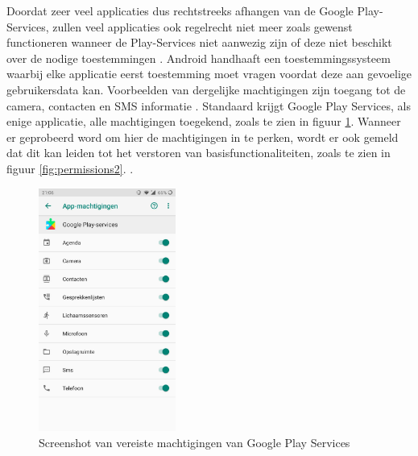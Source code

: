 Doordat zeer veel applicaties dus rechtstreeks afhangen van de Google Play-Services, zullen veel applicaties ook regelrecht niet meer zoals gewenst functioneren wanneer de Play-Services niet aanwezig zijn of deze niet beschikt over de nodige toestemmingen \autocite{marshall_google-play-services}. Android handhaaft een toestemmingssysteem waarbij elke applicatie eerst toestemming moet vragen voordat deze aan gevoelige gebruikersdata kan. Voorbeelden van dergelijke machtigingen zijn toegang tot de camera, contacten en SMS informatie \autocite{android_permissions}. Standaard krijgt Google Play Services, als enige applicatie, alle machtigingen toegekend, zoals te zien in figuur \ref{fig:permissions1}. Wanneer er geprobeerd word om hier de machtigingen in te perken, wordt er ook gemeld dat dit kan leiden tot het verstoren van basisfunctionaliteiten, zoals te zien in figuur \ref{fig:permissions2}. .

\begin{figure}
    \centering
    \includegraphics[width=0.4\textwidth]{img/machtigingen.jpg}
    \caption{Screenshot van vereiste machtigingen van Google Play Services}
    \label{fig:permissions1}
\end{figure}

